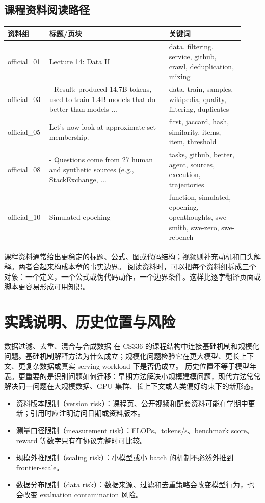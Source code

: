 \documentclass[a4paper]{article}
\begin{document}
\subsection{课程资料阅读路径}
\begin{longtable}{p{0.14\linewidth}p{0.48\linewidth}p{0.30\linewidth}}
\toprule
\textbf{资料组} & \textbf{标题/页块} & \textbf{关键词}\\
\midrule
official\_01 & Lecture 14: Data II & data, filtering, service, github, crawl, deduplication, mixing\\
official\_03 & - Result: produced 14.7B tokens, used to train 1.4B models that do better than models ... & data, train, samples, wikipedia, quality, filtering, duplicates\\
official\_05 & Let's now look at approximate set membership. & first, jaccard, hash, similarity, items, item, threshold\\
official\_08 & - Questions come from 27 human and synthetic sources (e.g., StackExchange, ... & tasks, github, better, agent, sources, execution, trajectories\\
official\_10 & Simulated epoching & function, simulated, epoching, openthoughts, swe-smith, swe-zero, swe-rebench\\
\bottomrule
\end{longtable}
课程资料通常给出更稳定的标题、公式、图或代码结构；视频则补充动机和口头解释。两者合起来构成本章的事实边界。
阅读资料时，可以把每个资料组拆成三个对象：一个定义，一个公式或伪代码动作，一个边界条件。这样比逐字翻译页面或脚本更容易形成可用知识。
\section{实践说明、历史位置与风险}
数据过滤、去重、混合与合成数据 在 CS336 的课程结构中连接基础机制和规模化问题。基础机制解释方法为什么成立；规模化问题检验它在更大模型、更长上下文、更复杂数据或真实 serving workload 下是否仍成立。
历史位置不等于模型年表。更重要的是识别问题如何迁移：早期方法解决小规模建模问题，现代方法常常解决同一问题在大规模数据、GPU 集群、长上下文或人类偏好约束下的新形态。
\begin{itemize}
\item 资料版本限制（version risk）：课程页、公开视频和配套资料可能在学期中更新；引用时应注明访问日期或资料版本。
\item 测量口径限制（measurement risk）：FLOPs、tokens/s、benchmark score、reward 等数字只有在协议完整时可比较。
\item 规模外推限制（scaling risk）：小模型或小 batch 的机制不必然外推到 frontier-scale。
\item 数据分布限制（data risk）：数据来源、过滤和去重策略会改变模型行为，也会改变 evaluation contamination 风险。
\end{itemize}
\end{document}

